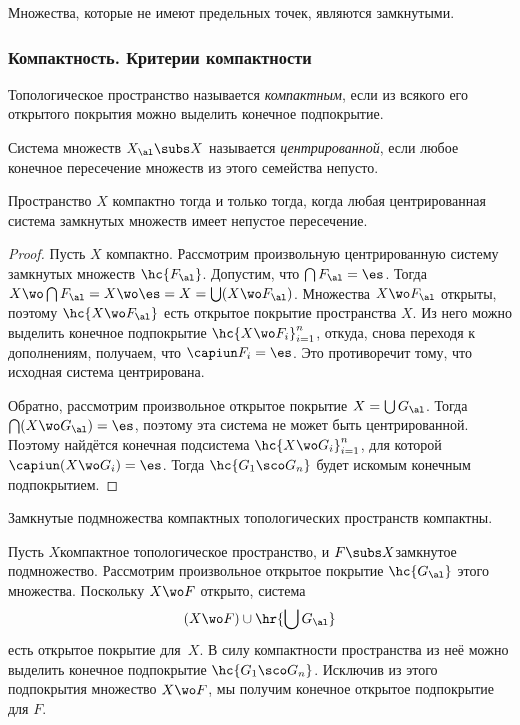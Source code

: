 \documentclass[a4paper]{article}
\begin{document}
\begin{imp}
Множества, которые не имеют предельных точек, являются замкнутыми.
\end{imp}


\subsubsection{Компактность. Критерии компактности}

\begin{df}
Топологическое пространство называется \emph{компактным}, если из всякого его открытого покрытия
можно выделить конечное подпокрытие.
\end{df}

\begin{df}
Система множеств $X_\al \subs X$ называется \emph{центрированной}, если любое конечное пересечение
множеств из этого семейства непусто.
\end{df}


\begin{theorem}
\label{th:comp.eq.cent.sys}
Пространство $X$ компактно тогда и только тогда, когда любая центрированная система замкнутых множеств имеет
непустое пересечение.
\end{theorem}
\begin{proof}
Пусть $X$ компактно. Рассмотрим произвольную центрированную систему замкнутых множеств $\hc{F_\al}$.
Допустим, что $\bigcap F_\al = \es$. Тогда
$X \wo \bigcap F_\al = X \wo \es = X = \bigcup (X \wo F_\al)$.
Множества $X \wo F_\al$ открыты, поэтому $\hc{X \wo F_\al}$ есть открытое покрытие пространства $X$.
Из него можно выделить конечное подпокрытие $\hc{X \wo F_i}_{i=1}^n$, откуда, снова переходя к дополнениям,
получаем, что $\capiun F_i = \es$. Это противоречит тому, что исходная система центрирована.

Обратно, рассмотрим произвольное открытое покрытие $X = \bigcup G_\al$.
Тогда $\bigcap (X \wo G_\al) = \es$,
поэтому эта система не может быть центрированной. Поэтому найдётся конечная подсистема $\hc{X \wo G_i}_{i=1}^n$,
для которой $\capiun (X \wo G_i) = \es$.
Тогда $\hc{G_1\sco G_n}$ будет искомым конечным подпокрытием.
\end{proof}

\begin{problem}
Замкнутые подмножества компактных топологических пространств компактны.
\end{problem}
\begin{solution}
Пусть $X$\т компактное топологическое пространство, и $F \subs X$\т замкнутое подмножество.
Рассмотрим произвольное открытое покрытие $\hc{G_\al}$ этого множества. Поскольку $X \wo F$ открыто,
система
$$(X \wo F) \cup \hr{\bigcup G_\al}$$
есть открытое покрытие для~$X$. В силу компактности пространства из неё можно выделить конечное подпокрытие
$\hc{G_1\sco G_n}$. Исключив из этого подпокрытия множество $X \wo F$, мы получим
конечное открытое подпокрытие для $F$.
\end{solution}
\end{document}
